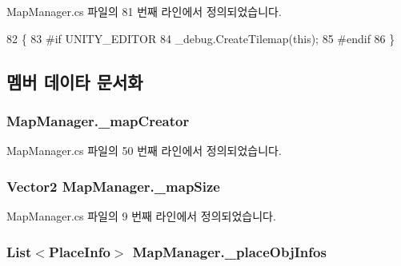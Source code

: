 Map\+Manager.\+cs 파일의 81 번째 라인에서 정의되었습니다.


\begin{DoxyCode}
82     \{
83 \textcolor{preprocessor}{#if UNITY\_EDITOR}
84         \_debug.CreateTilemap(\textcolor{keyword}{this});
85 \textcolor{preprocessor}{#endif}
86     \}
\end{DoxyCode}


\subsection{멤버 데이타 문서화}
\subsubsection[{\texorpdfstring{\+\_\+map\+Creator}{_mapCreator}}]{ Map\+Manager.\+\_\+map\+Creator\hspace{0.3cm}{\ttfamily [private]}}\hypertarget{class_map_manager_aa837a852f355a33b263c1bb07c6c4ece}{}\label{class_map_manager_aa837a852f355a33b263c1bb07c6c4ece}


Map\+Manager.\+cs 파일의 50 번째 라인에서 정의되었습니다.

\subsubsection[{\texorpdfstring{\+\_\+map\+Size}{_mapSize}}]{\setlength{\rightskip}{0pt plus 5cm}Vector2 Map\+Manager.\+\_\+map\+Size\hspace{0.3cm}{\ttfamily [private]}}\hypertarget{class_map_manager_a960f398cc92f569f620ddc8c0140a5c7}{}\label{class_map_manager_a960f398cc92f569f620ddc8c0140a5c7}


Map\+Manager.\+cs 파일의 9 번째 라인에서 정의되었습니다.

\subsubsection[{\texorpdfstring{\+\_\+place\+Obj\+Infos}{_placeObjInfos}}]{\setlength{\rightskip}{0pt plus 5cm}List$<${\bf Place\+Info}$>$ Map\+Manager.\+\_\+place\+Obj\+Infos\hspace{0.3cm}{\ttfamily [private]}}\hypertarget{class_map_manager_ab581d2c754246f74999a0b744ba2b14f}{}\label{class_map_manager_ab581d2c754246f74999a0b744ba2b14f}


